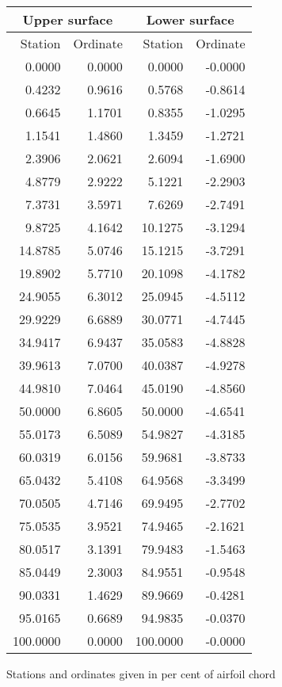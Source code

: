 \documentclass[11pt]{book}
\begin{document}
 \hspace{4mm}
 \begin{tabular}{|r|r|r|r|} \hline 
 \multicolumn{2}{|c|}{Upper surface} & \multicolumn{2}{|c|}{Lower surface} \\
 \hline
 Station & Ordinate & Station & Ordinate \\
 \hline
0.0000 & 0.0000 & 0.0000 & -0.0000 \\
0.4232 & 0.9616 & 0.5768 & -0.8614 \\
0.6645 & 1.1701 & 0.8355 & -1.0295 \\
1.1541 & 1.4860 & 1.3459 & -1.2721 \\
2.3906 & 2.0621 & 2.6094 & -1.6900 \\
4.8779 & 2.9222 & 5.1221 & -2.2903 \\
7.3731 & 3.5971 & 7.6269 & -2.7491 \\
9.8725 & 4.1642 & 10.1275 & -3.1294 \\
14.8785 & 5.0746 & 15.1215 & -3.7291 \\
19.8902 & 5.7710 & 20.1098 & -4.1782 \\
24.9055 & 6.3012 & 25.0945 & -4.5112 \\
29.9229 & 6.6889 & 30.0771 & -4.7445 \\
34.9417 & 6.9437 & 35.0583 & -4.8828 \\
39.9613 & 7.0700 & 40.0387 & -4.9278 \\
44.9810 & 7.0464 & 45.0190 & -4.8560 \\
50.0000 & 6.8605 & 50.0000 & -4.6541 \\
55.0173 & 6.5089 & 54.9827 & -4.3185 \\
60.0319 & 6.0156 & 59.9681 & -3.8733 \\
65.0432 & 5.4108 & 64.9568 & -3.3499 \\
70.0505 & 4.7146 & 69.9495 & -2.7702 \\
75.0535 & 3.9521 & 74.9465 & -2.1621 \\
80.0517 & 3.1391 & 79.9483 & -1.5463 \\
85.0449 & 2.3003 & 84.9551 & -0.9548 \\
90.0331 & 1.4629 & 89.9669 & -0.4281 \\
95.0165 & 0.6689 & 94.9835 & -0.0370 \\
100.0000 & 0.0000 & 100.0000 & -0.0000 \\
 \hline 
 \end{tabular}
 \vspace{8mm}

Stations and ordinates given in per cent of airfoil chord
\end{document}
